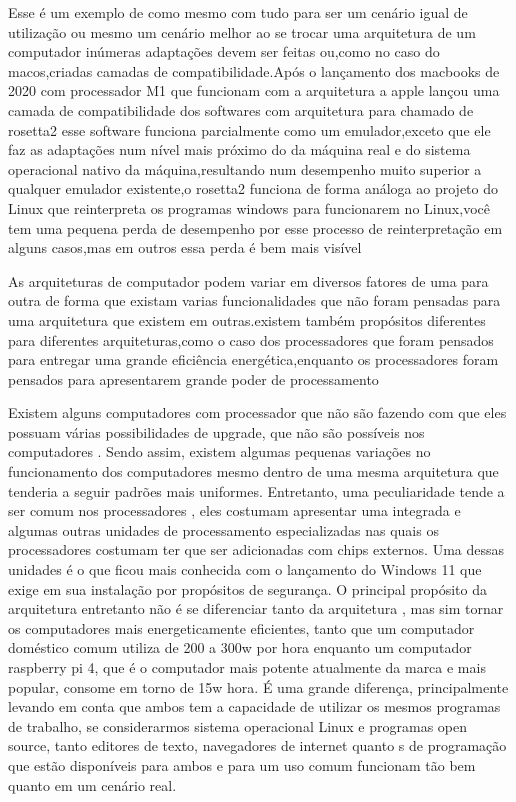 \documentclass[
	12pt,				%
	openright,			%
	oneside,			%
	a4paper,			%
	english,			%
	french,				%
	spanish,			%
	brazil,				%
	]{abntex2}
\begin{document}
Esse é um exemplo de como mesmo com tudo para ser um cenário igual de utilização ou mesmo um cenário melhor ao se trocar uma arquitetura de um computador inúmeras adaptações devem ser feitas ou,como no caso do macos,criadas camadas de compatibilidade.Após o lançamento dos macbooks de 2020 com processador M1 que funcionam com a arquitetura  a apple lançou uma camada de compatibilidade dos softwares com arquitetura  para  chamado de rosetta2 esse software funciona parcialmente como um emulador,exceto que ele faz as adaptações num nível mais próximo do da máquina real e do sistema operacional nativo da máquina,resultando num desempenho muito superior a qualquer emulador existente,o rosetta2 funciona de forma análoga ao projeto  do Linux que reinterpreta os programas windows para funcionarem no Linux,você tem uma pequena perda de desempenho por esse processo de reinterpretação em alguns casos,mas em outros essa perda é bem mais visível\newline

As arquiteturas de computador podem variar em diversos fatores de uma para outra de forma que existam varias funcionalidades que não foram pensadas para uma arquitetura que existem em outras.existem também propósitos diferentes para diferentes arquiteturas,como o caso dos processadores  que foram pensados para entregar uma grande eficiência energética,enquanto os processadores  foram pensados para apresentarem grande poder de processamento\newline

Existem alguns computadores com processador  que não são  fazendo com que eles possuam várias possibilidades de upgrade, que não são possíveis nos computadores . Sendo assim, existem algumas pequenas variações no funcionamento dos computadores mesmo dentro de uma mesma arquitetura que tenderia a seguir padrões mais uniformes. Entretanto, uma peculiaridade tende a ser comum nos processadores , eles costumam apresentar uma  integrada e algumas outras unidades de processamento especializadas nas quais os processadores  costumam ter que ser adicionadas com chips externos. Uma dessas unidades é o  que ficou mais conhecida com o lançamento do Windows 11 que exige em sua instalação por propósitos de segurança. O principal propósito da arquitetura  entretanto não é se diferenciar tanto da arquitetura , mas sim tornar os computadores mais energeticamente eficientes, tanto que um computador doméstico comum utiliza de 200 a 300w por hora enquanto um computador raspberry pi 4, que é o computador  mais potente atualmente da marca e mais popular, consome em torno de 15w hora. É uma grande diferença, principalmente levando em conta que ambos tem a capacidade de utilizar os mesmos programas de trabalho, se considerarmos sistema operacional Linux e programas open source, tanto editores de texto, navegadores de internet quanto s de programação que estão disponíveis para ambos e para um uso comum funcionam tão bem quanto em um cenário real.\newline
\end{document}
